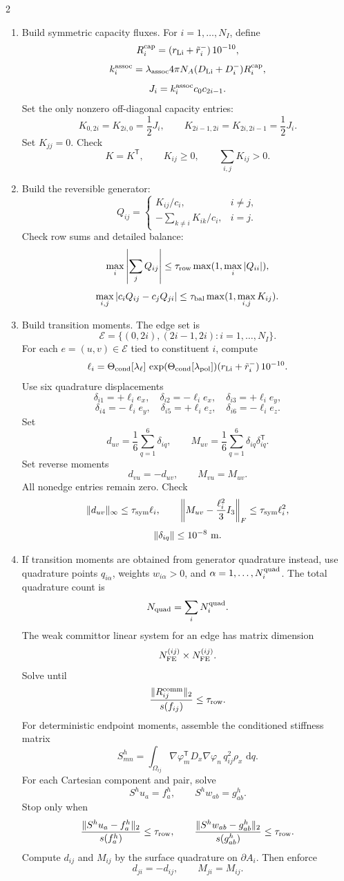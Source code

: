 \documentclass[10pt]{article}
\newcommand{\dd}{\,\mathrm d}
\newcommand{\T}{\mathsf{T}}
\begin{document}
\begin{multicols}{2}
\begin{enumerate}[label=\textbf{A\arabic*.}]
\item Build symmetric capacity fluxes. For \(i=1,\ldots,N_I\), define
\[
R_i^{\rm cap}
=(r_{\rm Li}+\tilde r_i^-)\,10^{-10},
\]
\[
k_i^{\rm assoc}
=
\lambda_{\rm assoc}
4\pi N_A(D_{\rm Li}+D_i^-)R_i^{\rm cap},
\]
\[
J_i=k_i^{\rm assoc}c_0c_{2i-1}.
\]
Set the only nonzero off-diagonal capacity entries:
\[
K_{0,2i}=K_{2i,0}=\frac12J_i,
\qquad
K_{2i-1,2i}=K_{2i,2i-1}=\frac12J_i.
\]
Set \(K_{jj}=0\). Check
\[
K=K^\T,
\qquad
K_{ij}\ge0,
\qquad
\sum_{i,j}K_{ij}>0.
\]

\item Build the reversible generator:
\[
Q_{ij}=
\begin{cases}
K_{ij}/c_i, & i\ne j,\\
-\sum_{k\ne i}K_{ik}/c_i, & i=j.
\end{cases}
\]
Check row sums and detailed balance:
\[
\max_i\left|\sum_jQ_{ij}\right|
\le
\tau_{\rm row}\max(1,\max_i|Q_{ii}|),
\]
\[
\max_{i,j}|c_iQ_{ij}-c_jQ_{ji}|
\le
\tau_{\rm bal}\max(1,\max_{i,j}K_{ij}).
\]

\item Build transition moments. The edge set is
\[
\mathcal E
=
\{(0,2i),(2i-1,2i):i=1,\ldots,N_I\}.
\]
For each \(e=(u,v)\in\mathcal E\) tied to constituent \(i\), compute
\[
\ell_i
=
\Theta_{\rm cond}[\lambda_\ell]\,
\exp(\Theta_{\rm cond}[\lambda_{\rm pol}])
(r_{\rm Li}+\tilde r_i^-)\,10^{-10}.
\]
Use six quadrature displacements
\[
\delta_{i1}=+\ell_i e_x,
\quad
\delta_{i2}=-\ell_i e_x,
\quad
\delta_{i3}=+\ell_i e_y,
\]
\[
\delta_{i4}=-\ell_i e_y,
\quad
\delta_{i5}=+\ell_i e_z,
\quad
\delta_{i6}=-\ell_i e_z.
\]
Set
\[
d_{uv}=\frac16\sum_{q=1}^6\delta_{iq},
\qquad
M_{uv}=\frac16\sum_{q=1}^6\delta_{iq}\delta_{iq}^{\T}.
\]
Set reverse moments
\[
d_{vu}=-d_{uv},
\qquad
M_{vu}=M_{uv}.
\]
All nonedge entries remain zero. Check
\[
\|d_{uv}\|_\infty\le\tau_{\rm sym}\ell_i,
\qquad
\left\|M_{uv}-\frac{\ell_i^2}{3}I_3\right\|_F
\le\tau_{\rm sym}\ell_i^2,
\]
\[
\|\delta_{iq}\|\le10^{-8}\ {\rm m}.
\]

\item If transition moments are obtained from generator quadrature instead,
use quadrature points \(q_{i\alpha}\), weights \(w_{i\alpha}>0\), and
\(\alpha=1,\ldots,N_i^{\rm quad}\). The total quadrature count is
\[
N_{\rm quad}=\sum_iN_i^{\rm quad}.
\]
The weak committor linear system for an edge has matrix dimension
\[
N_{\rm FE}^{(ij)}\times N_{\rm FE}^{(ij)}.
\]
Solve until
\[
\frac{\|R_{ij}^{\rm comm}\|_2}{s(f_{ij})}\le\tau_{\rm row}.
\]
For deterministic endpoint moments, assemble the conditioned stiffness matrix
\[
S^{h}_{mn}
=
\int_{\Omega_{ij}}
\nabla\varphi_m^\T D_x\nabla\varphi_n\,q_{ij}^2\rho_x\,\dd q.
\]
For each Cartesian component and pair, solve
\[
S^hu_a=f_a^h,
\qquad
S^hw_{ab}=g_{ab}^h.
\]
Stop only when
\[
\frac{\|S^hu_a-f_a^h\|_2}{s(f_a^h)}\le\tau_{\rm row},
\qquad
\frac{\|S^hw_{ab}-g_{ab}^h\|_2}{s(g_{ab}^h)}\le\tau_{\rm row}.
\]
Compute \(d_{ij}\) and \(M_{ij}\) by the surface quadrature on
\(\partial A_i\). Then enforce
\[
d_{ji}=-d_{ij},
\qquad
M_{ji}=M_{ij}.
\]


\end{enumerate}
\end{multicols}
\end{document}
